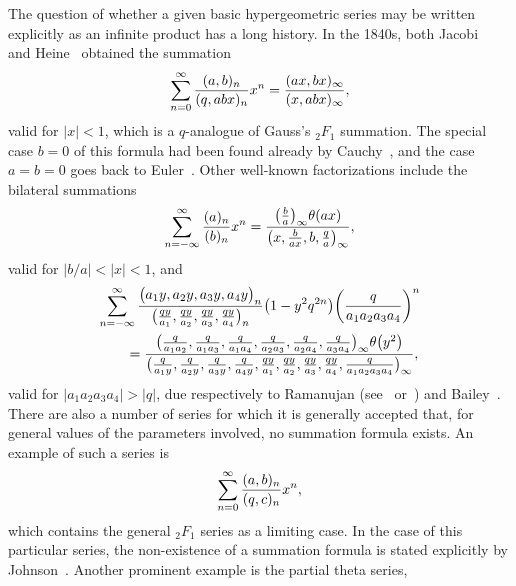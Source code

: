 \documentclass[10pt,a4paper]{amsart}
\numberwithin{equation}{section}
\begin{document}
The question of whether a given basic hypergeometric series may be written explicitly as an infinite product has a long history. In the 1840s, both Jacobi~\cite[equation~(15)]{Jacobi1846} and Heine~\cite[equation~(80)]{Heine1847} obtained the summation
\begin{equation} \label{eqn:q-Gauss}
\sum_{n=0}^\infty {(a,b)_n \over (q,abx)_n} x^n = {(ax,bx)_\infty \over (x,abx)_\infty},
\end{equation}
valid for $|x|<1$, which is a $q$-analogue of Gauss's $_2F_1$ summation. The special case ${b=0}$ of this formula had been found already by Cauchy~\cite[Section~I, equation~(15)]{Cauchy1843}, and the case~${a=b=0}$ goes back to Euler~\cite[Section~25]{Euler1753}. Other well-known factorizations include the bilateral summations
\begin{equation} \label{eqn:1psi1}
\sum_{n=-\infty}^\infty {(a)_n \over (b)_n} x^n = {\bigl({b \over a}\bigr)_\infty \theta(ax) \over \bigl(x,{b \over ax},b,{q \over a}\bigr)_\infty},
\end{equation}
valid for $|b/a|<|x|<1$, and
\begin{gather}
\sum_{n=-\infty}^\infty {\bigl(a_1y,a_2y,a_3y,a_4y\bigr)_n \over \bigl({qy \over a_1}, {qy \over a_2}, {qy \over a_3}, {qy \over a_4}\bigr)_n} \bigl( 1 - y^2q^{2n} \bigr) \bigg( {q \over a_1a_2a_3a_4} \bigg)^{ n}\nonumber \\
\qquad = {\bigl({q \over a_1a_2}, {q \over a_1a_3}, {q \over a_1a_4}, {q \over a_2a_3}, {q \over a_2a_4}, {q \over a_3a_4}\bigr)_\infty \theta\bigl(y^2\bigr) \over \bigl({q \over a_1y}, {q \over a_2y}, {q \over a_3y}, {q \over a_4y}, {qy \over a_1}, {qy \over a_2}, {qy \over a_3}, {qy \over a_4}, {q \over a_1a_2a_3a_4}\bigr)_\infty},\label{eqn:6psi6}
\end{gather}
valid for $|a_1a_2a_3a_4|>|q|$, due respectively to Ramanujan (see~\cite[Sections~3.2 and~3.3]{Andrews2009} or~\cite[pp.~222--223]{Hardy1940}) and Bailey~\cite[equation~(4.7)]{Bailey1936}. There are also a number of series for which it is generally accepted that, for general values of the parameters involved, no summation formula exists. An example of such a series is
\begin{equation} \label{eqn:2phi1_series}
\sum_{n=0}^\infty {(a,b)_n \over (q,c)_n} x^n,
\end{equation}
which contains the general $_2F_1$ series as a limiting case. In the case of this particular series, the non-existence of a summation formula is stated explicitly by Johnson~\cite[p.~227]{Johnson2020}. Another prominent example is the partial theta series,
\end{document}
